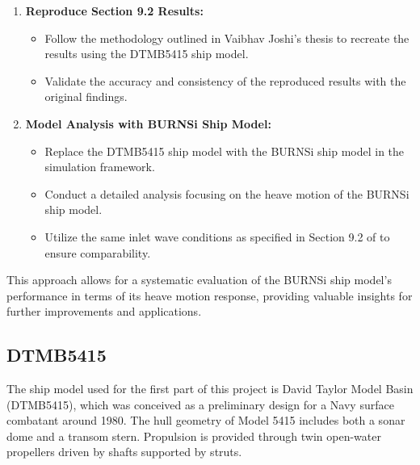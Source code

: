 \documentclass[12pt]{article} %
\begin{document}
\begin{enumerate}
    \item \textbf{Reproduce Section 9.2 Results:}
    \begin{itemize}
        \item Follow the methodology outlined in Vaibhav Joshi's thesis to recreate the results using the DTMB5415 ship model.
        \item Validate the accuracy and consistency of the reproduced results with the original findings.
    \end{itemize}
    \item \textbf{Model Analysis with BURNSi Ship Model:}
    \begin{itemize}
        \item Replace the DTMB5415 ship model with the BURNSi ship model in the simulation framework.
        \item Conduct a detailed analysis focusing on the heave motion of the BURNSi ship model.
        \item Utilize the same inlet wave conditions as specified in Section 9.2 of \cite{joshi2018} to ensure comparability.
    \end{itemize}
\end{enumerate}

This approach allows for a systematic evaluation of the BURNSi ship model's performance in terms of its heave motion response, providing valuable insights for further improvements and applications.
\subsection{DTMB5415}

The ship model used for the first part of this project is David Taylor Model
Basin (DTMB5415), which was conceived as a preliminary design for a Navy surface combatant around 1980. The hull geometry of Model 5415 includes both a sonar dome and a transom stern. Propulsion is provided through twin open-water propellers driven by shafts supported by struts.
\end{document}
